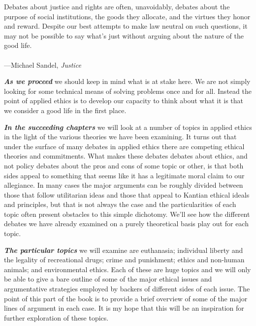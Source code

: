 \documentclass[
  12pt, openany]{book}
\newenvironment{epigraph}%
{
\begin{flushright}
\begin{minipage}{30em}
\begin{flushright}
\itshape
}%
{
\end{flushright}
\end{minipage}
\end{flushright}
\vspace{1em}
}
\begin{document}
\begin{epigraph}

Debates about justice and rights are often, unavoidably, debates about the purpose of social institutions, the goods they allocate, and the virtues they honor and reward. Despite our best attempts to make law neutral on such questions, it may not be possible to say what's just without arguing about the nature of the good life.\\
~\\
---Michael Sandel, \emph{Justice}

\end{epigraph}

\textbf{\emph{As we proceed}} we should keep in mind what is at stake here. We are not simply looking for some technical means of solving problems once and for all. Instead the point of applied ethics is to develop our capacity to think about what it is that we consider a good life in the first place.

\textbf{\emph{In the succeeding chapters}} we will look at a number of topics in applied ethics in the light of the various theories we have been examining. It turns out that under the surface of many debates in applied ethics there are competing ethical theories and commitments. What makes these debates debates about ethics, and not policy debates about the pros and cons of some topic or other, is that both sides appeal to something that seems like it has a legitimate moral claim to our allegiance. In many cases the major arguments can be roughly divided between those that follow utilitarian ideas and those that appeal to Kantian ethical ideals and principles, but that is not always the case and the particularities of each topic often present obstacles to this simple dichotomy. We'll see how the different debates we have already examined on a purely theoretical basis play out for each topic.

\textbf{\emph{The particular topics}} we will examine are euthanasia; individual liberty and the legality of recreational drugs; crime and punishment; ethics and non-human animals; and environmental ethics. Each of these are huge topics and we will only be able to give a bare outline of some of the major ethical issues and argumentative strategies employed by backers of different sides of each issue. The point of this part of the book is to provide a brief overview of some of the major lines of argument in each case. It is my hope that this will be an inspiration for further exploration of these topics.
\end{document}
